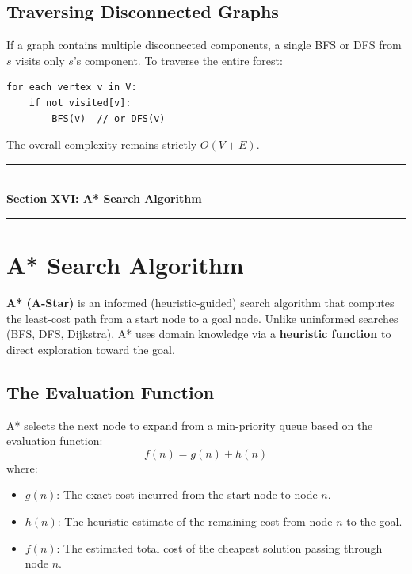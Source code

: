 \subsection{Traversing Disconnected Graphs}
If a graph contains multiple disconnected components, a single BFS or DFS from $s$ visits only $s$'s component. To traverse the entire forest:
\begin{lstlisting}[style=pseudocode]
for each vertex v in V:
    if not visited[v]:
        BFS(v)  // or DFS(v)
\end{lstlisting}
The overall complexity remains strictly $\boxed{O(V + E)}$.

\newpage
\begin{center}
\vspace{0.5em}
{\color{primary}\rule{0.45\textwidth}{1.2pt}}\\[4pt]
{\Large\bfseries\color{primary} Section XVI: A* Search Algorithm}\\[2pt]
{\color{primary}\rule{0.45\textwidth}{1.2pt}}
\vspace{0.5em}
\end{center}

\section{A* Search Algorithm}

\textbf{A* (A-Star)} is an informed (heuristic-guided) search algorithm that computes the least-cost path from a start node to a goal node. Unlike uninformed searches (BFS, DFS, Dijkstra), A* uses domain knowledge via a \textbf{heuristic function} to direct exploration toward the goal.

\subsection{The Evaluation Function}
A* selects the next node to expand from a min-priority queue based on the evaluation function:
\[
\boxed{f(n) = g(n) + h(n)}
\]
where:
\begin{itemize}
    \item $g(n)$: The exact cost incurred from the start node to node $n$.
    \item $h(n)$: The heuristic estimate of the remaining cost from node $n$ to the goal.
    \item $f(n)$: The estimated total cost of the cheapest solution passing through node $n$.
\end{itemize}

